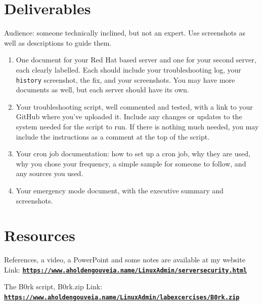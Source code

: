 \documentclass[12pt]{article}
\begin{document}
\section*{Deliverables}
Audience: someone technically inclined, but not an expert. Use screenshots as well as descriptions to guide them.
\begin{enumerate}
    \item One document for your Red Hat based server and one for your second server, each clearly labelled. Each should include your troubleshooting log, your \texttt{history} screenshot, the fix, and your screenshots. You may have more documents as well, but each server should have its own.
    \item Your troubleshooting script, well commented and tested, with a link to your GitHub where you've uploaded it. Include any changes or updates to the system needed for the script to run. If there is nothing much needed, you may include the instructions as a comment at the top of the script.
    \item Your cron job documentation: how to set up a cron job, why they are used, why you chose your frequency, a simple sample for someone to follow, and any sources you used.
    \item Your emergency mode document, with the executive summary and screenshots.
\end{enumerate}

\section*{Resources}
References, a video, a PowerPoint and some notes are available at my website
Link: \href{https://www.aholdengouveia.name/LinuxAdmin/serversecurity.html}{\textbf{\nolinkurl{https://www.aholdengouveia.name/LinuxAdmin/serversecurity.html}}}

The B0rk script, B0rk.zip
Link: \href{https://www.aholdengouveia.name/LinuxAdmin/labexcercises/B0rk.zip}{\textbf{\nolinkurl{https://www.aholdengouveia.name/LinuxAdmin/labexcercises/B0rk.zip}}}
\end{document}
